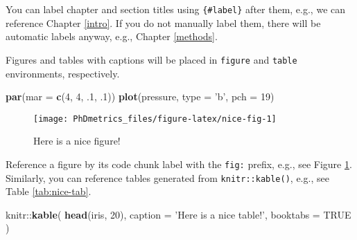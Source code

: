\documentclass[]{book}
\newenvironment{Shaded}{\begin{snugshade}}{\end{snugshade}}
\newcommand{\KeywordTok}[1]{\textcolor[rgb]{0.13,0.29,0.53}{\textbf{{#1}}}}
\newcommand{\DataTypeTok}[1]{\textcolor[rgb]{0.13,0.29,0.53}{{#1}}}
\newcommand{\DecValTok}[1]{\textcolor[rgb]{0.00,0.00,0.81}{{#1}}}
\newcommand{\StringTok}[1]{\textcolor[rgb]{0.31,0.60,0.02}{{#1}}}
\newcommand{\OtherTok}[1]{\textcolor[rgb]{0.56,0.35,0.01}{{#1}}}
\newcommand{\NormalTok}[1]{{#1}}
\begin{document}
You can label chapter and section titles using \texttt{\{\#label\}}
after them, e.g., we can reference Chapter \ref{intro}. If you do not
manually label them, there will be automatic labels anyway, e.g.,
Chapter \ref{methods}.

Figures and tables with captions will be placed in \texttt{figure} and
\texttt{table} environments, respectively.

\begin{Shaded}
\begin{Highlighting}[]
\KeywordTok{par}\NormalTok{(}\DataTypeTok{mar =} \KeywordTok{c}\NormalTok{(}\DecValTok{4}\NormalTok{, }\DecValTok{4}\NormalTok{, .}\DecValTok{1}\NormalTok{, .}\DecValTok{1}\NormalTok{))}
\KeywordTok{plot}\NormalTok{(pressure, }\DataTypeTok{type =} \StringTok{'b'}\NormalTok{, }\DataTypeTok{pch =} \DecValTok{19}\NormalTok{)}
\end{Highlighting}
\end{Shaded}

\begin{figure}

{\centering \texttt{[image: PhDmetrics\_files/figure-latex/nice-fig-1]} 

}

\caption{Here is a nice figure!}\label{fig:nice-fig}
\end{figure}

Reference a figure by its code chunk label with the \texttt{fig:}
prefix, e.g., see Figure \ref{fig:nice-fig}. Similarly, you can
reference tables generated from \texttt{knitr::kable()}, e.g., see Table
\ref{tab:nice-tab}.

\begin{Shaded}
\begin{Highlighting}[]
\NormalTok{knitr::}\KeywordTok{kable}\NormalTok{(}
  \KeywordTok{head}\NormalTok{(iris, }\DecValTok{20}\NormalTok{), }\DataTypeTok{caption =} \StringTok{'Here is a nice table!'}\NormalTok{,}
  \DataTypeTok{booktabs =} \OtherTok{TRUE}
\NormalTok{)}
\end{Highlighting}
\end{Shaded}
\end{document}
